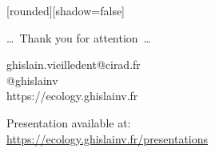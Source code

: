 
{
  [rounded][shadow=false]
  \begin{frame}[plain]
    \begin{block}{}
      \begin{center}
        \ldots~Thank you for attention~\ldots
      \end{center}
    \end{block}
    \vspace{1cm}
    \begin{block}{}
      \begin{center}
        ghislain.vieilledent@cirad.fr\\
        @ghislainv\\
        https://ecology.ghislainv.fr
      \end{center}
    \end{block}
    \vspace{1cm}
    \begin{block}{}
      \begin{center}
				Presentation available at:\\
				\url{https://ecology.ghislainv.fr/presentations}
      \end{center}
    \end{block}
  \end{frame}
}